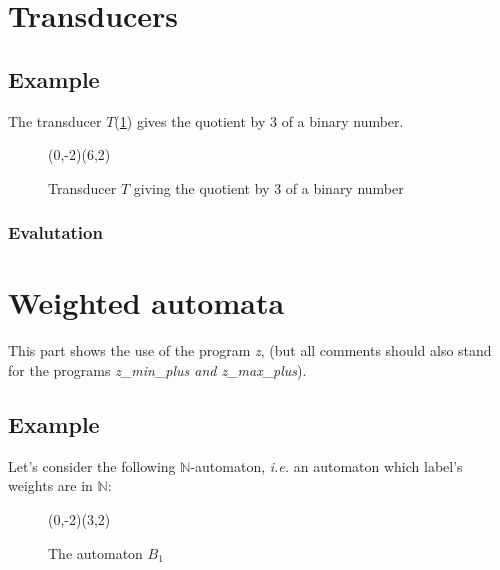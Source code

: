 \section{Transducers}
\subsection{Example}

The transducer $T$(\ref{bindiv3}) gives the quotient by 3 of a binary number.

\begin{figure}[h]
  \begin{center}
    \begin{VCPicture}{(0,-2)(6,2)}
  
\end{VCPicture}
\caption{Transducer $T$ giving the quotient by 3 of a binary number}
\label{bindiv3}
  \end{center}
\end{figure}

\subsubsection{Evalutation}


\section{Weighted automata}

This part shows the use of the program \textit{z}, (but all
comments should also stand for the programs \textit{z\_min\_plus and
z\_max\_plus}).

\subsection{Example}

Let's consider the following $\mathbb{N}$-automaton, \textit{i.e.}
an automaton which label's weights are in $\mathbb{N}$:

\begin{figure}[ht] \centering
  \begin{VCPicture}{(0,-2)(3,2)}
     
     
     
     
  \end{VCPicture}
  \caption{The automaton $B_1$}
\end{figure}


